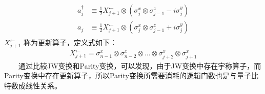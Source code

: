 \documentclass[a4paper,11pt,english]{sphinxmanual}
\begin{document}
\sphinxAtStartPar
{}
\begin{equation*}
\begin{split}\begin{aligned}a_{j}^{\dagger} & \equiv \frac{1}{2} X_{j+1}^{\leftarrow} \otimes\left(\sigma_{j}^{x} \otimes \sigma_{j-1}^{z}-i \sigma_{j}^{y}\right) \\a_{j} & \equiv \frac{1}{2} X_{j+1}^{\leftarrow} \otimes\left(\sigma_{j}^{x} \otimes \sigma_{j-1}^{z}+i \sigma_{j}^{y}\right)\end{aligned}\end{split}
\end{equation*}
\sphinxAtStartPar
\(X_{j+1}^{\leftarrow}\) 称为更新算子，定义式如下：
\begin{equation*}
\begin{split}X_{j+1}^{\leftarrow}=\sigma_{n-1}^{x} \otimes \sigma_{n-2}^{x} \otimes \ldots \otimes \sigma_{j+2}^{x} \otimes \sigma_{j+1}^{x}\end{split}
\end{equation*}
\sphinxAtStartPar
  通过比较J\sphinxhyphen{}W变换和Parity变换，可以发现，由于J\sphinxhyphen{}W变换中存在宇称算子，而Parity变换中存在更新算子，所以Parity变换所需要消耗的逻辑门数也是与量子比特数成线性关系。
\end{document}

